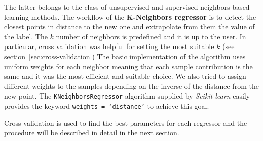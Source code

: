 The latter belongs to the class of unsupervised and supervised neighbors-based learning methods.
The workflow of the \textbf{K-Neighbors regressor} is to detect the closest points in distance to the new one and extrapolate from them the value of the label.
The $k$ number of neighbors is predefined and it is up to the user. In particular, cross validation was helpful for setting the most suitable $k$ (see section~\ref{sec:cross-validation})   
The basic implementation of the algorithm uses uniform weights for each neighbor meaning that each sample contribution is the same and it was the most efficient and suitable choice.
We also tried to assign different weights to the samples depending on the inverse of the distance from the new point.
The \texttt{KNeighborsRegressor} algorithm supplied by \textit{Scikit-learn} easily provides the keyword \texttt{weights = `distance'} to achieve this goal. 

Cross-validation is used to find the best parameters for each regressor and the procedure will be described in detail in the next section.
